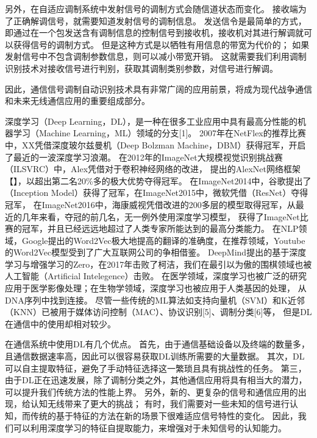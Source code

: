 另外，在自适应调制系统中发射信号的调制方式会随信道状态而变化。
接收端为了正确解调信号，就需要知道发射信号的调制信息。
发送信令是最简单的方式，即通过在一个包发送含有调制信息的控制信号到接收机，接收机对其进行解调就可以获得信号的调制方式。
但是这种方式是以牺牲有用信息的带宽为代价的；
如果发射信号中不包含调制参数信息，则可以减小带宽开销。
这就需要我们利用调制识别技术对接收信号进行判别，获取其调制类别参数，对信号进行解调。\par

因此，通信信号调制自动识别技术具有非常广阔的应用前景，将成为现代战争通信和未来无线通信应用的重要组成部分。\par

深度学习（Deep Learning，DL），是一种在很多工业应用中具有最高分性能的机器学习（Machine Learning，ML）领域的分支[1]。 
2007年在NetFlex的推荐比赛中，XX凭借深度玻尔兹曼机（Deep Bolzman Machine，DBM）获得冠军，开启了最近的一波深度学习浪潮。
在2012年的ImageNet大规模视觉识别挑战赛（ILSVRC）中，Alex凭借对于卷积神经网络的改进，
提出的AlexNet网络框架【】，以超出第二名20\%多的极大优势夺得冠军。
在ImageNet2014中，谷歌提出了（Inception Model）获得了冠军，在ImageNet2015中，微软凭借（ResNet）夺得冠军，
在ImageNet2016中，海康威视凭借改进的200多层的模型取得冠军，从最近的几年来看，夺冠的前几名，无一例外使用深度学习模型，
获得了ImageNet比赛的冠军，并且已经远远地超过了人类专家所能达到的最高分类能力。
在NLP领域，Google提出的Word2Vec极大地提高的翻译的准确度，在推荐领域，Youtube的Word2Vec模型受到了广大互联网公司的争相借鉴。
DeepMind提出的基于深度学习与增强学习的Zero，在2017年击败了柯洁，我们在最引以为傲的围棋领域也被人工智能（Artificial Intelegence）击败。
在医学领域，深度学习也被广泛的研究应用于医学影像处理；在生物学领域，深度学习也被应用于人类基因的处理， 从DNA序列中找到连接。
尽管一些传统的ML算法如支持向量机（SVM）和K近邻（KNN）已被用于媒体访问控制（MAC）、协议识别[5]、调制分类[6]等，
但是DL在通信中的使用却相对较少。\par

在通信系统中使用DL有几个优点。 
首先，由于通信基础设备以及终端的数量多，且通信数据速率高，因此可以很容易获取DL训练所需要的大量数据。
其次，DL可以自主提取特征，避免了手动特征选择这一繁琐且具有挑战性的任务。
第三，由于DL正在迅速发展，除了调制分类之外，其他通信应用将具有相当大的潜力，可以提升我们传统方法的性能上界。
另外，新的、更复杂的信号和通信应用的出现，给认知无线带来了更大的挑战；
有时，我们需要对一些未知的信号进行认知，而传统的基于特征的方法在新的场景下很难适应信号特性的变化。
因此，我们可以利用深度学习的特征自提取能力，来增强对于未知信号的认知能力。\par


